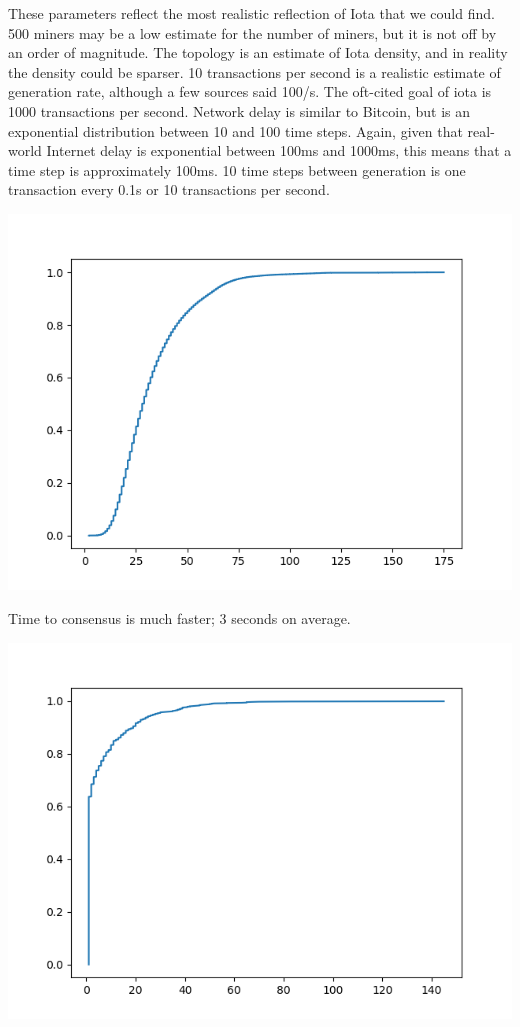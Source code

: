 \documentclass[letterpaper,11pt]{article}
\begin{document}
These parameters reflect the most realistic reflection of Iota that we could find. 500 miners may be a low estimate for the number of miners, but it is not off by an order of magnitude. The topology is an estimate of Iota density, and in reality the density could be sparser. 10 transactions per second is a realistic estimate of generation rate, although a few sources said 100/s. The oft-cited goal of iota is 1000 transactions per second. Network delay is similar to Bitcoin, but is an exponential distribution between 10 and 100 time steps. Again, given that real-world Internet delay is exponential between 100ms and 1000ms, this means that a time step is approximately 100ms. 10 time steps between generation is one transaction every 0.1s or 10 transactions per second.

\includegraphics[scale=0.5]{realiotatimes}

Time to consensus is much faster; 3 seconds on average.

\includegraphics[scale=0.5]{realiotadisc}
\end{document}
